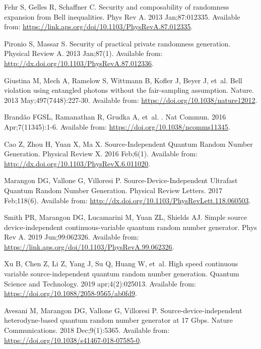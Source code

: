 \documentclass[]{interact}
\theoremstyle{plain}%
\theoremstyle{definition}
\theoremstyle{remark}
\begin{document}
\begin{thebibliography}{100}
Fehr S, Gelles R, Schaffner C.
\newblock Security and composability of randomness expansion from Bell
  inequalities.
\newblock Phys Rev A. 2013 Jan;87:012335.
\newblock Available from:
  \url{https://link.aps.org/doi/10.1103/PhysRevA.87.012335}.

Pironio S, Massar S.
\newblock Security of practical private randomness generation.
\newblock Physical Review A. 2013 Jan;87(1).
\newblock Available from: \url{http://dx.doi.org/10.1103/PhysRevA.87.012336}.

Giustina M, Mech A, Ramelow S, Wittmann B, Kofler J, Beyer J, et~al.
\newblock Bell violation using entangled photons without the fair-sampling
  assumption.
\newblock Nature. 2013 May;497(7448):227-30.
\newblock Available from: \url{https://doi.org/10.1038/nature12012}.

Brand{\ifmmode{}\else\~{a}\fi}o FGSL, Ramanathan R, Grudka A, et~al.
.
\newblock Nat Commun. 2016 Apr;7(11345):1-6.
\newblock Available from: \url{https://doi.org/10.1038/ncomms11345}.

Cao Z, Zhou H, Yuan X, Ma X.
\newblock Source-Independent Quantum Random Number Generation.
\newblock Physical Review X. 2016 Feb;6(1).
\newblock Available from: \url{http://dx.doi.org/10.1103/PhysRevX.6.011020}.

Marangon DG, Vallone G, Villoresi P.
\newblock Source-Device-Independent Ultrafast Quantum Random Number Generation.
\newblock Physical Review Letters. 2017 Feb;118(6).
\newblock Available from:
  \url{http://dx.doi.org/10.1103/PhysRevLett.118.060503}.

Smith PR, Marangon DG, Lucamarini M, Yuan ZL, Shields AJ.
\newblock Simple source device-independent continuous-variable quantum random
  number generator.
\newblock Phys Rev A. 2019 Jun;99:062326.
\newblock Available from:
  \url{https://link.aps.org/doi/10.1103/PhysRevA.99.062326}.

Xu B, Chen Z, Li Z, Yang J, Su Q, Huang W, et~al.
\newblock High speed continuous variable source-independent quantum random
  number generation.
\newblock Quantum Science and Technology. 2019 apr;4(2):025013.
\newblock Available from: \url{https://doi.org/10.1088/2058-9565/ab0fd9}.

Avesani M, Marangon DG, Vallone G, Villoresi P.
\newblock Source-device-independent heterodyne-based quantum random number
  generator at 17 Gbps.
\newblock Nature Communications. 2018 Dec;9(1):5365.
\newblock Available from: \url{https://doi.org/10.1038/s41467-018-07585-0}.


\end{thebibliography}
\end{document}
